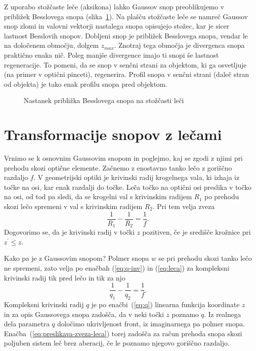 \begin{remark}
Z uporabo stožčaste leče (aksikona) lahko Gaussov snop
preoblikujemo v približek Besslovega snopa (slika~\ref{fig:Bessel_leca}). 
Na plašču stožčaste leče se namreč Gaussov snop zlomi in valovni vektorji 
nastalega snopa opisujejo stožec, kar je sicer lastnost Besslovih snopov.
Dobljeni snop je približek Besslovega snopa, vendar le na določenem območju, dolgem $z_{max}$.
Znotraj tega območja je divergenca snopa praktično enaka nič. Poleg manjše divergence
imajo ti snopi še lastnost regeneracije. To pomeni, da se snop v senčni strani
za objektom, ki ga osvetljuje (na primer v optični pinceti), regenerira. 
Profil snopa v senčni strani (daleč stran od objekta) je tako enak profilu 
snopa pred objektom. 
\begin{figure}[h]
\centering
\def\svgwidth{90truemm} 

\caption{Nastanek približka Besslovega snopa na stožčasti leči}
\label{fig:Bessel_leca}
\end{figure}
\end{remark}

\section{Transformacije snopov z lečami}

Vrnimo se k osnovnim Gaussovim snopom in poglejmo, kaj se zgodi z njimi pri prehodu
skozi optične elemente. Začnemo
z enostavno tanko lečo z goriščno razdaljo $f$. V geometrijski optiki
je krivinski radij krogelnega vala, ki izhaja iz točke na osi, kar
enak razdalji do točke. Leča točko na optični osi preslika v točko na osi,
od tod pa sledi, da se krogelni val s krivinskim radijem $R_{1}$
po prehodu skozi lečo spremeni v val s krivinskim radijem $R_{2}$.
Pri tem velja zveza 
\begin{equation}
\frac{1}{R_{1}}-\frac{1}{R_{2}}=\frac{1}{f}.
\label{eq:leca}
\end{equation}
Dogovorimo se, da je krivinski radij v točki $z$ pozitiven, če je središče krožnice pri $z^{\prime}\le z$.

Kako pa je z Gaussovim snopom? Polmer snopa $w$ se pri prehodu 
skozi tanko lečo ne spremeni, zato velja po enačbah (\ref{eq:q-inv}) in 
(\ref{eq:leca}) za kompleksni krivinski radij tik pred lečo in tik za njo
\begin{equation}
\frac{1}{q_{1}}-\frac{1}{q_{2}}=\frac{1}{f}.
\label{eq:preslikava-zveza-leca}
\end{equation}
Kompleksni krivinski radij $q$ je po enačbi~(\ref{eq:q}) linearna 
funkcija koordinate $z$ in za opis Gaussovega snopa zadošča, da
v neki točki $z$ poznamo $q$. Iz realnega dela parametra $q$ določimo ukrivljenost front, iz 
imaginarnega pa polmer snopa. Enačba~(\ref{eq:preslikava-zveza-leca}) torej
zadošča za račun prehoda snopa skozi poljuben sistem leč brez aberacij, če le poznamo
njegovo goriščno razdaljo.


